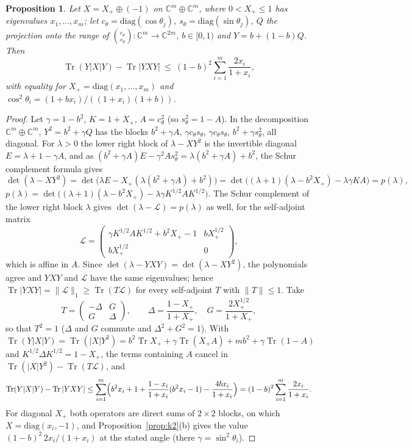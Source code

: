 \documentclass[11pt]{article}
\DeclareMathOperator{\Tr}{Tr}
\newcommand{\C}{\mathbb{C}}
\newtheorem{proposition}{Proposition}
\begin{document}
\begin{proposition}\label{prop:mblocks}
Let $X=X_+\oplus(-1)$ on $\C^m\oplus\C^m$, where $0<X_+\le1$ has eigenvalues $x_1,\dots,x_m$; let
$c_\theta=\mathrm{diag}(\cos\theta_j)$, $s_\theta=\mathrm{diag}(\sin\theta_j)$, $Q$ the projection onto the range of
$\binom{c_\theta}{s_\theta}:\C^m\to\C^{2m}$, $b\in[0,1)$ and $Y=b+(1-b)Q$. Then
\[
  \Tr(Y|X|Y)-\Tr|YXY|\ \le\ (1-b)^2\sum_{i=1}^m\frac{2x_i}{1+x_i},
\]
with equality for $X_+=\mathrm{diag}(x_1,\dots,x_m)$ and $\cos^2\theta_i=(1+bx_i)/((1+x_i)(1+b))$.
\end{proposition}
\begin{proof}
Let $\gamma=1-b^2$, $K=1+X_+$, $A=c_\theta^2$ (so $s_\theta^2=1-A$). In the decomposition $\C^m\oplus\C^m$,
$Y^2=b^2+\gamma Q$ has the blocks $b^2+\gamma A$, $\gamma c_\theta s_\theta$, $\gamma c_\theta s_\theta$, $b^2+\gamma s_\theta^2$, all diagonal.
For $\lambda>0$ the lower right block of $\lambda-XY^2$ is the invertible diagonal $E=\lambda+1-\gamma A$, and as
$(b^2+\gamma A)E-\gamma^2As_\theta^2=\lambda(b^2+\gamma A)+b^2$, the Schur complement formula gives
\[
  \det(\lambda-XY^2)=\det\bigl(\lambda E-X_+(\lambda(b^2+\gamma A)+b^2)\bigr)=\det\bigl((\lambda+1)(\lambda-b^2X_+)-\lambda\gamma KA\bigr)
  =p(\lambda),
\]
$p(\lambda)=\det\bigl((\lambda+1)(\lambda-b^2X_+)-\lambda\gamma K^{1/2}AK^{1/2}\bigr)$. The Schur complement of the lower right
block $\lambda$ gives $\det(\lambda-\mathcal L)=p(\lambda)$ as well, for the self-adjoint matrix
\[
  \mathcal L=\begin{pmatrix}\gamma K^{1/2}AK^{1/2}+b^2X_+-1 & bX_+^{1/2}\\ bX_+^{1/2} & 0\end{pmatrix},
\]
which is affine in $A$. Since $\det(\lambda-YXY)=\det(\lambda-XY^2)$, the polynomials agree and $YXY$ and $\mathcal L$ have
the same eigenvalues; hence $\Tr|YXY|=\|\mathcal L\|_1\ge\Tr(T\mathcal L)$ for every self-adjoint $T$ with $\|T\|\le1$.
Take
\[
  T=\begin{pmatrix}-\Delta & G\\ G & \Delta\end{pmatrix},\qquad \Delta=\frac{1-X_+}{1+X_+},\quad G=\frac{2X_+^{1/2}}{1+X_+},
\]
so that $T^2=1$ ($\Delta$ and $G$ commute and $\Delta^2+G^2=1$). With $\Tr(Y|X|Y)=\Tr(|X|Y^2)=b^2\Tr X_++\gamma\Tr(X_+A)+mb^2+\gamma\Tr(1-A)$
and $K^{1/2}\Delta K^{1/2}=1-X_+$, the terms containing $A$ cancel in $\Tr(|X|Y^2)-\Tr(T\mathcal L)$, and
\[
  \Tr(Y|X|Y)-\Tr|YXY|\le\sum_{i=1}^m\Bigl(b^2x_i+1+\frac{1-x_i}{1+x_i}(b^2x_i-1)-\frac{4bx_i}{1+x_i}\Bigr)=(1-b)^2\sum_{i=1}^m\frac{2x_i}{1+x_i}.
\]
For diagonal $X_+$ both operators are direct sums of $2\times2$ blocks, on which $X=\mathrm{diag}(x_i,-1)$, and
Proposition~\ref{prop:k2}(b) gives the value $(1-b)^2\,2x_i/(1+x_i)$ at the stated angle (there $\gamma=\sin^2\theta_i$).
\end{proof}
\end{document}
